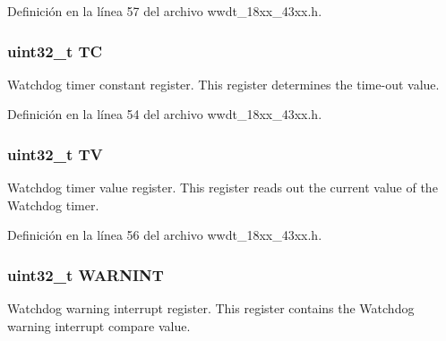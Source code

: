 Definición en la línea 57 del archivo wwdt\+\_\+18xx\+\_\+43xx.\+h.

\subsubsection[{\texorpdfstring{TC}{TC}}]{ uint32\+\_\+t TC}\hypertarget{struct_l_p_c___w_w_d_t___t_abb0bc781f4dc091c913978e313c03d25}{}\label{struct_l_p_c___w_w_d_t___t_abb0bc781f4dc091c913978e313c03d25}
Watchdog timer constant register. This register determines the time-\/out value. 

Definición en la línea 54 del archivo wwdt\+\_\+18xx\+\_\+43xx.\+h.

\subsubsection[{\texorpdfstring{TV}{TV}}]{ uint32\+\_\+t TV}\hypertarget{struct_l_p_c___w_w_d_t___t_ac7f33c773f59346c097bd9c2e544af28}{}\label{struct_l_p_c___w_w_d_t___t_ac7f33c773f59346c097bd9c2e544af28}
Watchdog timer value register. This register reads out the current value of the Watchdog timer. 

Definición en la línea 56 del archivo wwdt\+\_\+18xx\+\_\+43xx.\+h.

\subsubsection[{\texorpdfstring{W\+A\+R\+N\+I\+NT}{WARNINT}}]{ uint32\+\_\+t W\+A\+R\+N\+I\+NT}\hypertarget{struct_l_p_c___w_w_d_t___t_a35d90fc251dd2f0e5125c7cee94020c4}{}\label{struct_l_p_c___w_w_d_t___t_a35d90fc251dd2f0e5125c7cee94020c4}
Watchdog warning interrupt register. This register contains the Watchdog warning interrupt compare value. 


